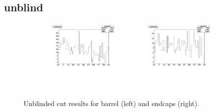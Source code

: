 \subsection{unblind}

\begin{figure}[!h]
  \centering
  \includegraphics[width=0.45\textwidth]{Figures/cnt/SA_barrel_mass_unblind}
  \includegraphics[width=0.45\textwidth]{Figures/cnt/SA_endcaps_mass_unblind}
\caption{Unblinded cut results for barrel (left) and endcaps (right).}
\end{figure}

